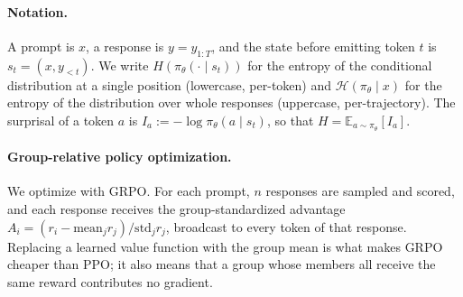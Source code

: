 \documentclass[11pt]{article}
\newcommand{\Htraj}{\mathcal{H}}
\newcommand{\E}{\mathbb{E}}
\newcommand{\pit}{\pi_{\theta}}
\begin{document}
\paragraph{Notation.}
A prompt is $x$, a response is $y = y_{1:T}$, and the state before emitting token
$t$ is $s_t = (x, y_{<t})$. We write $H(\pit(\cdot \mid s_t))$ for the entropy of
the conditional distribution at a single position (lowercase, per-token) and
$\Htraj(\pit \mid x)$ for the entropy of the distribution over whole responses
(uppercase, per-trajectory). The surprisal of a token $a$ is
$I_a := -\log \pit(a \mid s_t)$, so that $H = \E_{a \sim \pit}[I_a]$.

\paragraph{Group-relative policy optimization.}
We optimize with GRPO. For each prompt, $n$ responses are sampled and scored, and
each response receives the group-standardized advantage
$A_i = (r_i - \mathrm{mean}_j r_j) / \mathrm{std}_j r_j$, broadcast to every token
of that response. Replacing a learned value function with the group mean is what
makes GRPO cheaper than PPO; it also means that a group whose members all receive
the same reward contributes no gradient.
\end{document}
